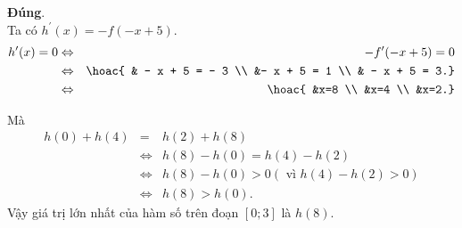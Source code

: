\begin{ex}
{\begin{itemchoice}
			\itemch \textbf{Đúng}.\\
Ta có $h^\prime(x)=-f(-x+5)$.
\begin{eqnarray*} 
				h^{\prime}(x)=0 &\Leftrightarrow&-f^{\prime}(-x+5)=0 \\
				& \Leftrightarrow&\hoac{
					& - x + 5 = - 3  \\
					&- x + 5 = 1  \\
					& - x + 5 = 3.}\\
		&\Leftrightarrow&\hoac{
					&x=8 \\
					&x=4 \\
					&x=2.}		
\end{eqnarray*}
			\begin{center}
		\end{center}
 Mà \begin{eqnarray*}
 	 h(0)+h(4)&=&h(2)+h(8) \\
				& \Leftrightarrow& h(8)-h(0)=h(4)-h(2) \\
				& \Leftrightarrow& h(8)-h(0)>0(\text { vì } h(4)-h(2)>0) \\
				& \Leftrightarrow& h(8)>h(0).
 \end{eqnarray*}
Vậy giá trị lớn nhất của hàm số trên đoạn $[0 ; 3]$ là $h(8)$.
		\end{itemchoice}
	}
\end{ex}
